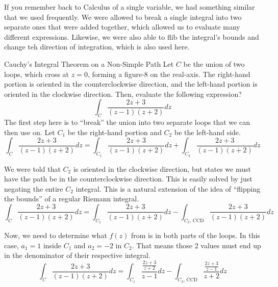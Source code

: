 \begin{remark*}
  If you remember back to Calculus of a single variable, we had something similar that we used frequently.
  We were allowed to break a single integral into two separate ones that were added together, which allowed us to evaluate many different expressions.
  Likewise, we were also able to flib the integral's bounds and change teh direction of integration, which is also used here.
\end{remark*}

\begin{example}{Cauchy's Integral Theorem on a Non-Simple Path}
  Let $C$ be the union of two loops, which cross at $z=0$, forming a figure-8 on the real-axis.
  The right-hand portion is oriented in the counterclockwise direction, and the left-hand portion is oriented in the clockwise direction.
  Then, evaluate the following expression?
  \begin{equation*}
    \int_{C} \frac{2z + 3}{(z-1) (z+2)} dz
  \end{equation*}
  \tcblower{}
  The first step here is to ``break'' the union into two separate loops that we can then use  on.
  Let $C_{1}$ be the right-hand portion and $C_{2}$ be the left-hand side.
  \begin{equation*}
    \int_{C} \frac{2z + 3}{(z-1) (z+2)} dz = \int_{C_{1}} \frac{2z + 3}{(z-1) (z+2)} dz + \int_{C_{2}} \frac{2z + 3}{(z-1) (z+2)} dz
  \end{equation*}

  We were told that $C_{2}$ is oriented in the clockwise direction, but  states we must have the path be in the counterclockwise direction.
  This is easily solved by just negating the entire $C_{2}$ integral.
  This is a natural extension of the idea of ``flipping the bounds'' of a regular Riemann integral.
  \begin{equation*}
    \int_{C} \frac{2z + 3}{(z-1) (z+2)} dz = \int_{C_{1}} \frac{2z + 3}{(z-1) (z+2)} dz - \int_{C_{2}\text{, CCD}} \frac{2z + 3}{(z-1) (z+2)} dz
  \end{equation*}

  Now, we need to determine what $f(z)$ from  is in both parts of the loops.
  In this case, $a_{1}=1$ inside $C_{1}$ and $a_{2}=-2$ in $C_{2}$.
  That means those 2 values must end up in the denominator of their respective integral.
  \begin{equation*}
    \int_{C} \frac{2z + 3}{(z-1) (z+2)} dz = \int_{C_{1}} \frac{\frac{2z + 3}{z+2}}{z-1} dz - \int_{C_{2}\text{, CCD}} \frac{\frac{2z + 3}{z-1}}{z+2} dz
  \end{equation*}


\end{example}
